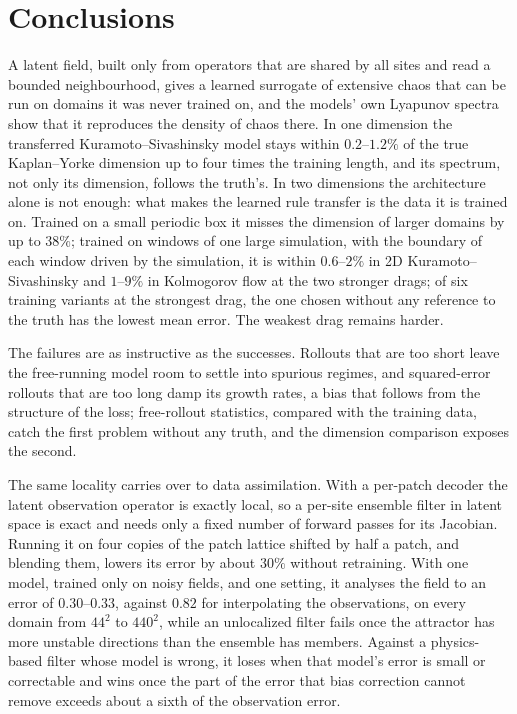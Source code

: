 \section{Conclusions}
\label{sec:conclusions}

A latent field, built only from operators that are shared by all sites
and read a bounded neighbourhood, gives a learned surrogate of extensive
chaos that can be run on domains it was never trained on, and the
models' own Lyapunov spectra show that it reproduces the density of
chaos there. In one dimension the transferred Kuramoto--Sivashinsky model
stays within $0.2$--$1.2\%$ of the true Kaplan--Yorke dimension up to four
times the training length, and its spectrum, not only its dimension,
follows the truth's. In two dimensions the architecture alone is not
enough: what makes the learned rule transfer is the data it is trained
on. Trained on a small periodic box it misses the dimension of larger
domains by up to $38\%$; trained on windows of one large simulation, with
the boundary of each window driven by the simulation, it is within
$0.6$--$2\%$ in 2D Kuramoto--Sivashinsky and $1$--$9\%$ in Kolmogorov flow at
the two stronger drags; of six training variants at the strongest drag,
the one chosen without any reference to the truth has the lowest mean
error. The weakest drag remains harder.

The failures are as instructive as the successes. Rollouts that are too
short leave the free-running model room to settle into spurious regimes,
and squared-error rollouts that are too long damp its growth rates, a
bias that follows from the structure of the loss; free-rollout
statistics, compared with the training data, catch the first problem
without any truth, and the dimension comparison exposes the second.

The same locality carries over to data assimilation. With a per-patch
decoder the latent observation operator is exactly local, so a per-site
ensemble filter in latent space is exact and needs only a fixed number of
forward passes for its Jacobian. Running it on four copies of the patch
lattice shifted by half a patch, and blending them, lowers its error by
about $30\%$ without retraining. With one model, trained only on noisy fields,
and one setting, it analyses the field to an error of $0.30$--$0.33$, against $0.82$
for interpolating the observations, on every domain from $44^2$ to $440^2$,
while an unlocalized filter fails once the attractor has more unstable
directions than the ensemble has members. Against a physics-based filter
whose model is wrong, it loses when that model's error is small or
correctable and wins once the part of the error that bias correction
cannot remove exceeds about a sixth of the observation error.

